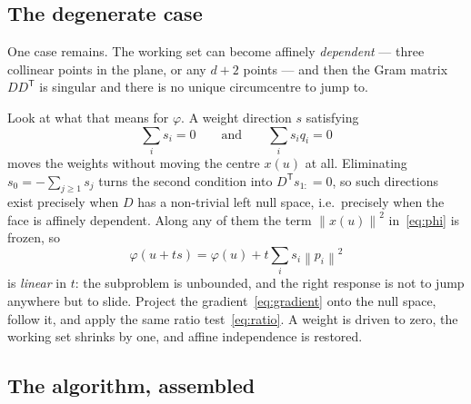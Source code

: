 \documentclass[11pt,a4paper]{article}
\theoremstyle{plain}
\theoremstyle{definition}
\theoremstyle{remark}
\newcommand{\norm}[1]{\left\lVert #1 \right\rVert}
\newcommand{\transpose}{^{\mathsf{T}}}
\begin{document}
\subsection{The degenerate case}

One case remains. The working set can become affinely \emph{dependent} --- three
collinear points in the plane, or any $d+2$ points --- and then the Gram matrix
$DD\transpose$ is singular and there is no unique circumcentre to jump to.

Look at what that means for $\varphi$. A weight direction $s$ satisfying
\[
  \sum_i s_i = 0 \qquad\text{and}\qquad \sum_i s_i q_i = 0
\]
moves the weights without moving the centre $x(u)$ at all. Eliminating
$s_0 = -\sum_{j\ge1}s_j$ turns the second condition into $D\transpose s_{1:} = 0$,
so such directions exist precisely when $D$ has a non-trivial left null space,
i.e.\ precisely when the face is affinely dependent. Along any of them the term
$\norm{x(u)}^2$ in~\eqref{eq:phi} is frozen, so
\[
  \varphi(u + t s) = \varphi(u) + t \sum_i s_i \norm{p_i}^2
\]
is \emph{linear} in $t$: the subproblem is unbounded, and the right response is
not to jump anywhere but to slide. Project the gradient~\eqref{eq:gradient} onto
the null space, follow it, and apply the same ratio test~\eqref{eq:ratio}. A
weight is driven to zero, the working set shrinks by one, and affine independence
is restored.

\subsection{The algorithm, assembled}
\end{document}
